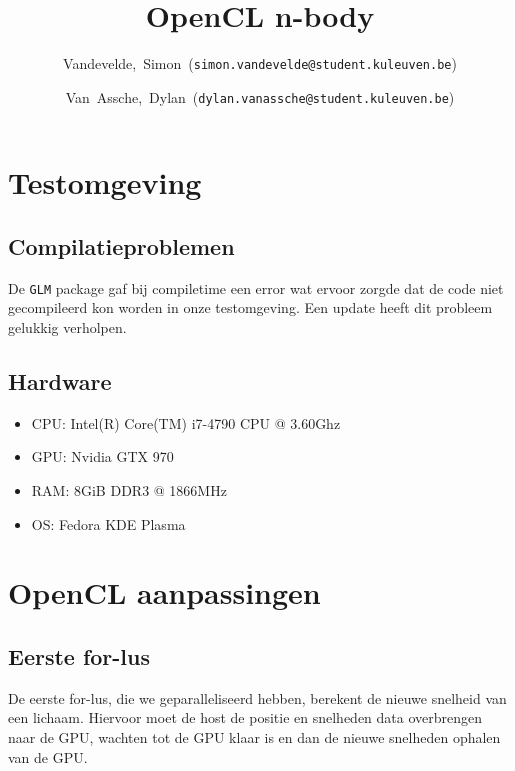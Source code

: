 \documentclass{article}
\title{OpenCL n-body}
\author{Vandevelde,~Simon~(\texttt{simon.vandevelde@student.kuleuven.be})
  \and
  Van~Assche,~Dylan~(\texttt{dylan.vanassche@student.kuleuven.be})}
\begin{document}
\maketitle %

\section{Testomgeving}
\subsection{Compilatieproblemen}

De \texttt{GLM} package gaf bij compiletime een error wat
ervoor zorgde dat de code niet gecompileerd kon worden in onze testomgeving.
Een update heeft dit probleem gelukkig verholpen.

\subsection{Hardware}
\begin{itemize}
    \item CPU: Intel(R) Core(TM) i7-4790 CPU @ 3.60Ghz
    \item GPU: Nvidia GTX 970
    \item RAM: 8GiB DDR3 @ 1866MHz
    \item OS: Fedora KDE Plasma
\end{itemize}

\section{OpenCL aanpassingen}
\subsection{Eerste for-lus}
\label{hfd:niet-atomisch-for1}
De eerste for-lus, die we geparalleliseerd hebben, berekent de nieuwe snelheid van een lichaam.
Hiervoor moet de host de positie en snelheden data overbrengen naar de GPU, wachten tot de GPU
klaar is en dan de nieuwe snelheden ophalen van de GPU.
\end{document}
